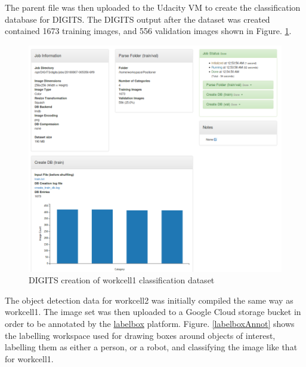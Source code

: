 \documentclass[10pt,journal,compsoc]{IEEEtran}
\begin{document}
The parent file was then uploaded to the Udacity VM to create the classification database for DIGITS. The DIGITS output after the dataset was created contained 1673 training images, and 556 validation images shown in Figure. \ref{workcell1DataInit}.

\begin{figure}[thpb]
  \centering
  \includegraphics[width=\linewidth]{../img/Workcell1-Classification/dataset/WC1-dataset_initalization.png}
  \caption{DIGITS creation of workcell1 classification dataset}
  \label{workcell1DataInit}
\end{figure}

The object detection data for workcell2 was initially compiled the same way as workcell1. The image set was then uploaded to a Google Cloud storage bucket in order to be annotated by the \href{https://www.labelbox.com/}{labelbox} platform. Figure. \ref{labelboxAnnot} shows the labelling workspace used for drawing boxes around objects of interest, labelling them as either a person, or a robot, and classifying the image like that for workcell1.
\end{document}
